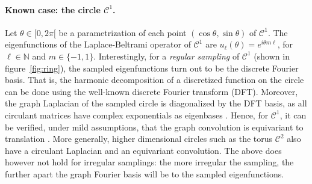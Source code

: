 \documentclass{article} %
\newcommand{\figref}[1]{figure~\ref{fig:#1}}
\newcommand{\1}{\b{1}}              %
\newcommand{\0}{\b{0}}              %
\begin{document}
\paragraph{Known case: the circle $\mathcal{C}^1$.}
Let $\theta\in[0,2\pi[$ be a parametrization of each point $(\cos\theta,\sin\theta)$ of $\mathcal{C}^1$.
The eigenfunctions of the Laplace-Beltrami operator of $\mathcal{C}^1$ are $u_\ell(\theta)=e^{i \theta m \ell}$, for $\ell \in \mathbb{N}$ and $m\in\{-1,1\}$.
Interestingly, for a \emph{regular sampling} of $\mathcal{C}^1$ (shown in \figref{ring}), the sampled eigenfunctions turn out to be the discrete Fourier basis.
That is, the harmonic decomposition of a discretized function on the circle can be done using the well-known discrete Fourier transform (DFT).
Moreover, the graph Laplacian of the sampled circle is diagonalized by the DFT basis, as all circulant matrices have complex exponentials as eigenbases \cite{strang1999dct}.
Hence, for $\mathcal{C}^1$, it can be verified, under mild assumptions, that the graph convolution is equivariant to translation \citep[section 2.2 and equation 3]{perraudin2017stationary}.
More generally, higher dimensional circles such as the torus $\mathcal{C}^2$ also have a circulant Laplacian and an equivariant convolution.
The above does however not hold for irregular samplings: the more irregular the sampling, the further apart the graph Fourier basis will be to the sampled eigenfunctions.

\end{document}
